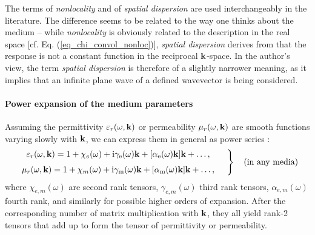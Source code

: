 The terms of \textit{nonlocality} and of \textit{spatial dispersion} are used interchangeably in the literature. The difference seems to be related to the way one thinks about the medium -- while \textit{nonlocality} is obviously related to the description in the real space [cf. Eq. (\ref{eq_chi_convol_nonloc})], \textit{spatial dispersion} derives from that the response is not a constant function in the reciprocal ${\mathbf{k}}$-space. In the author's view, the term \textit{spatial dispersion} is therefore of a slightly narrower meaning, as it implies that an infinite plane wave of a defined wavevector is being considered.

\paragraph{Power expansion of the medium parameters} %
Assuming the permittivity $\varepsilon_r(\omega,{\mathbf{k}})$ or permeability $\mu_r(\omega,{\mathbf{k}})$ are smooth functions varying slowly with ${\mathbf{k}}$, we can express them in general as power series \cite[p. 367]{landau1984electrodynamics}:
\begin{equation} 
\left.  \begin{array}{c}
\epsrn(\omega,\kk) = 1 + \chi_e(\omega) + \ii \gamma_{\text{e}}(\omega) \kk + [\alpha_{\text{e}}(\omega) \kk] \kk + \ldots, \medskip  \\
\murn(\omega,\kk) = 1 + \chi_m(\omega) + \ii \gamma_{\text{m}}(\omega) \kk + [\alpha_{\text{m}}(\omega) \kk] \kk + \ldots, 
\end{array} \quad \right\} \quad \text{(in any media)}
\label{eq_epsmusd1}\end{equation} %
where $\chi_{e,m}(\omega)$ are second rank tensors, $\gamma_{e,m}(\omega)$ third rank tensors, $\alpha_{e,m}(\omega)$ fourth rank, and similarly for possible higher orders of expansion. After the corresponding number of matrix multiplication with ${\mathbf{k}}$, they all yield rank-2 tensors that add up to form the tensor of permittivity or permeability.

